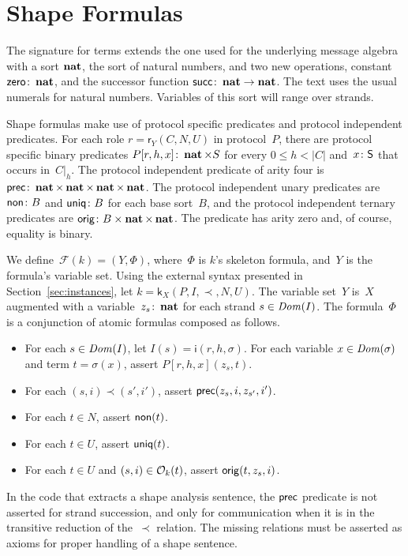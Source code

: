 \documentclass[12pt]{report}
\theoremstyle{definition}
\newcommand{\sdom}{\fn{Dom}}
\newcommand{\role}{\mathsf{r}}
\newcommand{\skel}{\mathsf{k}}
\newcommand{\inst}{\mathsf{i}}
\newcommand{\form}{\mathcal{F}}
\begin{document}
\section{Shape Formulas}

The signature for terms extends the one used for the underlying
message algebra with a sort $\operatorname{\mathbf{nat}}$, the sort of natural numbers,
and two new operations, constant $\operatorname{\mathsf{zero}}\colon\operatorname{\mathbf{nat}}$, and the
successor function $\operatorname{\mathsf{succ}}\colon\operatorname{\mathbf{nat}}\to\operatorname{\mathbf{nat}}$.  The text
uses the usual numerals for natural numbers.  Variables of this sort
will range over strands.

Shape formulas make use of protocol specific predicates and protocol
independent predicates.  For each role $r=\role_Y(C,N,U)$ in
protocol~$P$, there are protocol specific binary predicates
$P[r,h,x]\colon\operatorname{\mathbf{nat}}\times S$ for every $0\leq h<|C|$
and~$x\colon\mathsf{S}$ that occurs in~$C|_h$.  The protocol independent
predicate of arity four is $\operatorname{\mathsf{prec}}\colon
\operatorname{\mathbf{nat}}\times\operatorname{\mathbf{nat}}\times\operatorname{\mathbf{nat}}\times\operatorname{\mathbf{nat}}$.  The protocol
independent unary predicates are $\operatorname{\mathsf{non}}\colon B$ and
$\operatorname{\mathsf{uniq}}\colon B$ for each base sort~$B$, and the protocol
independent ternary predicates are $\operatorname{\mathsf{orig}}\colon
B\times\operatorname{\mathbf{nat}}\times\operatorname{\mathbf{nat}}$.  The predicate  has arity
zero and, of course, equality is binary.

We define~$\form(k)=(Y,\Phi)$, where~$\Phi$ is $k$'s skeleton formula,
and~$Y$ is the formula's variable set.  Using the external syntax
presented in Section~\ref{sec:instances}, let
$k=\skel_X(P,I,\prec,N,U)$.  The variable set~$Y$ is~$X$ augmented
with a variable~$z_s\colon\operatorname{\mathbf{nat}}$ for each strand
$s\in\sdom(I)$.  The formula~$\Phi$ is a conjunction of atomic
formulas composed as follows.

\begin{itemize}
\item For each $s\in\sdom(I)$, let $I(s)=\inst(r,h,\sigma)$.  For
  each variable $x\in\sdom(\sigma)$ and term $t=\sigma(x)$, assert
  $P[r,h,x](z_s,t)$.
\item For each $(s,i)\prec(s',i')$, assert
  $\operatorname{\mathsf{prec}}(z_s,i,z_{s'},i')$.
\item For each $t\in N$, assert $\operatorname{\mathsf{non}}(t)$.
\item For each $t\in U$, assert $\operatorname{\mathsf{uniq}}(t)$.
\item For each $t\in U$ and $(s,i)\in\mathcal{O}_k(t)$, assert
  $\operatorname{\mathsf{orig}}(t,z_s, i)$.
\end{itemize}

In the code that extracts a shape analysis sentence, the
$\operatorname{\mathsf{prec}}$ predicate is not asserted for strand succession, and
only for communication when it is in the transitive reduction of
the~$\prec$ relation.  The missing relations must be asserted as axioms
for proper handling of a shape sentence.
\end{document}

